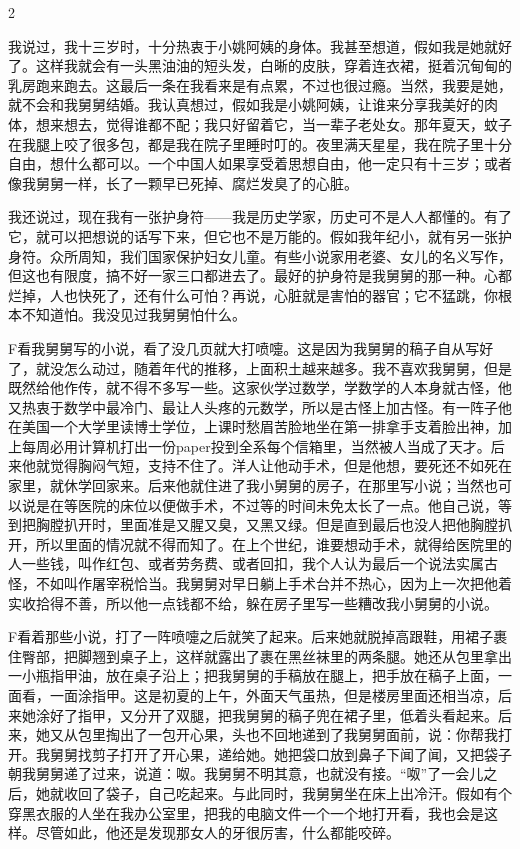 2 

我说过，我十三岁时，十分热衷于小姚阿姨的身体。我甚至想道，假如我是她就好了。这样我就会有一头黑油油的短头发，白晰的皮肤，穿着连衣裙，挺着沉甸甸的乳房跑来跑去。这最后一条在我看来是有点累，不过也很过瘾。当然，我要是她，就不会和我舅舅结婚。我认真想过，假如我是小姚阿姨，让谁来分享我美好的肉体，想来想去，觉得谁都不配；我只好留着它，当一辈子老处女。那年夏天，蚊子在我腿上咬了很多包，都是我在院子里睡时叮的。夜里满天星星，我在院子里十分自由，想什么都可以。一个中国人如果享受着思想自由，他一定只有十三岁；或者像我舅舅一样，长了一颗早已死掉、腐烂发臭了的心脏。 

我还说过，现在我有一张护身符——我是历史学家，历史可不是人人都懂的。有了它，就可以把想说的话写下来，但它也不是万能的。假如我年纪小，就有另一张护身符。众所周知，我们国家保护妇女儿童。有些小说家用老婆、女儿的名义写作，但这也有限度，搞不好一家三口都进去了。最好的护身符是我舅舅的那一种。心都烂掉，人也快死了，还有什么可怕？再说，心脏就是害怕的器官；它不猛跳，你根本不知道怕。我没见过我舅舅怕什么。 

F看我舅舅写的小说，看了没几页就大打喷嚏。这是因为我舅舅的稿子自从写好了，就没怎么动过，随着年代的推移，上面积土越来越多。我不喜欢我舅舅，但是既然给他作传，就不得不多写一些。这家伙学过数学，学数学的人本身就古怪，他又热衷于数学中最冷门、最让人头疼的元数学，所以是古怪上加古怪。有一阵子他在美国一个大学里读博士学位，上课时愁眉苦脸地坐在第一排拿手支着脸出神，加上每周必用计算机打出一份paper投到全系每个信箱里，当然被人当成了天才。后来他就觉得胸闷气短，支持不住了。洋人让他动手术，但是他想，要死还不如死在家里，就休学回家来。后来他就住进了我小舅舅的房子，在那里写小说；当然也可以说是在等医院的床位以便做手术，不过等的时间未免太长了一点。他自己说，等到把胸膛扒开时，里面准是又腥又臭，又黑又绿。但是直到最后也没人把他胸膛扒开，所以里面的情况就不得而知了。在上个世纪，谁要想动手术，就得给医院里的人一些钱，叫作红包、或者劳务费、或者回扣，我个人认为最后一个说法实属古怪，不如叫作屠宰税恰当。我舅舅对早日躺上手术台并不热心，因为上一次把他着实收拾得不善，所以他一点钱都不给，躲在房子里写一些糟改我小舅舅的小说。 

F看着那些小说，打了一阵喷嚏之后就笑了起来。后来她就脱掉高跟鞋，用裙子裹住臀部，把脚翘到桌子上，这样就露出了裹在黑丝袜里的两条腿。她还从包里拿出一小瓶指甲油，放在桌子沿上；把我舅舅的手稿放在腿上，把手放在稿子上面，一面看，一面涂指甲。这是初夏的上午，外面天气虽热，但是楼房里面还相当凉，后来她涂好了指甲，又分开了双腿，把我舅舅的稿子兜在裙子里，低着头看起来。后来，她又从包里掏出了一包开心果，头也不回地递到了我舅舅面前，说：你帮我打开。我舅舅找剪子打开了开心果，递给她。她把袋口放到鼻子下闻了闻，又把袋子朝我舅舅递了过来，说道：呶。我舅舅不明其意，也就没有接。“呶”了一会儿之后，她就收回了袋子，自己吃起来。与此同时，我舅舅坐在床上出冷汗。假如有个穿黑衣服的人坐在我办公室里，把我的电脑文件一个一个地打开看，我也会是这样。尽管如此，他还是发现那女人的牙很厉害，什么都能咬碎。 

